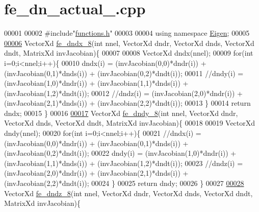\hypertarget{fe__dn__actual__8_8cpp_source}{}\section{fe\+\_\+dn\+\_\+actual\+\_.\+cpp}
\label{fe__dn__actual__8_8cpp_source}

\begin{DoxyCode}
00001 
00002 \textcolor{preprocessor}{#include"\hyperlink{functions_8h}{functions.h}"}
00003 
00004 \textcolor{keyword}{using namespace }\hyperlink{namespace_eigen}{Eigen};
00005 
\hyperlink{fe__dn__actual__8_8cpp_afc6be1a5667e68156cb099e8da71170f}{00006} VectorXd \hyperlink{fe__dn__actual__8_8cpp_afc6be1a5667e68156cb099e8da71170f}{fe\_dndx\_8}(\textcolor{keywordtype}{int} nnel, VectorXd dndr, VectorXd dnds, VectorXd dndt, MatrixXd invJacobian)\{
00007 
00008     VectorXd dndx(nnel);
00009     \textcolor{keywordflow}{for}(\textcolor{keywordtype}{int} i=0;i<nnel;i++)\{
00010         dndx(i) = (invJacobian(0,0)*dndr(i)) + (invJacobian(0,1)*dnds(i)) + (invJacobian(0,2)*dndt(i));
00011         \textcolor{comment}{//dndy(i) = (invJacobian(1,0)*dndr(i)) + (invJacobian(1,1)*dnds(i)) + (invJacobian(1,2)*dndt(i));}
00012         \textcolor{comment}{//dndz(i) = (invJacobian(2,0)*dndr(i)) + (invJacobian(2,1)*dnds(i)) + (invJacobian(2,2)*dndt(i));}
00013     \}
00014     \textcolor{keywordflow}{return} dndx;
00015 \}
00016 
\hyperlink{fe__dn__actual__8_8cpp_a0572d7818e085c67f7fbb84eef8ecfb4}{00017} VectorXd \hyperlink{fe__dn__actual__8_8cpp_a0572d7818e085c67f7fbb84eef8ecfb4}{fe\_dndy\_8}(\textcolor{keywordtype}{int} nnel, VectorXd dndr, VectorXd dnds, VectorXd dndt, MatrixXd invJacobian)\{
00018 
00019     VectorXd dndy(nnel);
00020     \textcolor{keywordflow}{for}(\textcolor{keywordtype}{int} i=0;i<nnel;i++)\{
00021         \textcolor{comment}{//dndx(i) = (invJacobian(0,0)*dndr(i)) + (invJacobian(0,1)*dnds(i)) + (invJacobian(0,2)*dndt(i));}
00022         dndy(i) = (invJacobian(1,0)*dndr(i)) + (invJacobian(1,1)*dnds(i)) + (invJacobian(1,2)*dndt(i));
00023         \textcolor{comment}{//dndz(i) = (invJacobian(2,0)*dndr(i)) + (invJacobian(2,1)*dnds(i)) + (invJacobian(2,2)*dndt(i));}
00024     \}
00025     \textcolor{keywordflow}{return} dndy;
00026 \}
00027 
\hyperlink{fe__dn__actual__8_8cpp_aaf75db8433433807839c6ea17f2cf72c}{00028} VectorXd \hyperlink{fe__dn__actual__8_8cpp_aaf75db8433433807839c6ea17f2cf72c}{fe\_dndz\_8}(\textcolor{keywordtype}{int} nnel, VectorXd dndr, VectorXd dnds, VectorXd dndt, MatrixXd invJacobian)\{

\end{DoxyCode}
